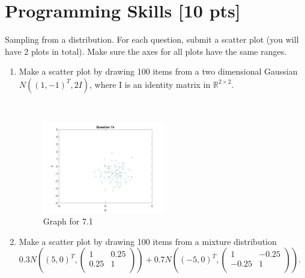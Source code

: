 \documentclass[a4paper]{article}
\theoremstyle{definition}
\newenvironment{soln}{
	\leavevmode\color{blue}\ignorespaces
}{}
\begin{document}
	
	
	\section{Programming Skills [10 pts]}
	Sampling from a distribution.  For each question, submit a scatter plot (you will have 2 plots in total).  Make sure the axes for all plots have the same ranges.
	\begin{enumerate}
		\item Make a scatter plot by drawing 100 items from a two dimensional Gaussian $N((1, -1)^{T}, 2I)$, where I is an identity matrix in $\mathbb{R}^{2 \times 2}$.
		
			\begin{soln}
            \\
			\begin{figure}[ht!]
			     \centering
			     \includegraphics[width=0.5\textwidth]{hw1/2dnorm_a.jpg}  
			     \captionsetup{labelformat=empty}
			     \caption{Graph for 7.1}
			     \label{fig:my_label4}
			 \end{figure}
		\end{soln}
	
		\item Make a scatter plot by drawing 100 items from a mixture distribution 
		$0.3 N\left((5, 0)^{T}, \begin{pmatrix} 1 & 0.25 \\ 0.25 & 1\\ \end{pmatrix}\right)
		+0.7 N\left((-5, 0)^{T}, \begin{pmatrix} 1 & -0.25 \\ -0.25 & 1\\ \end{pmatrix}\right)
		$.
		

\end{enumerate}
\end{document}
